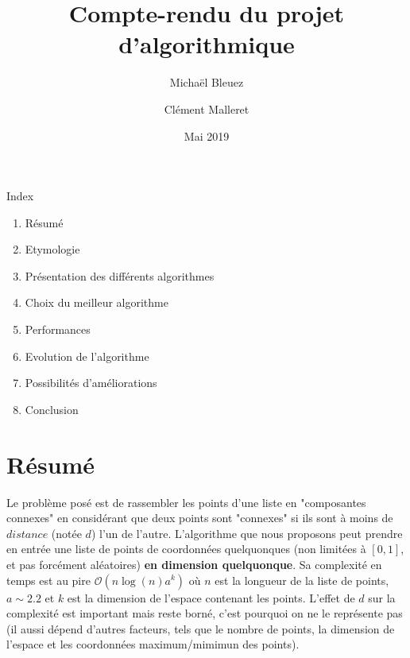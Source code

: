 \documentclass[a4paper,11pt]{article}
\title{Compte-rendu du projet d'algorithmique}
\author{Michaël Bleuez \and Clément Malleret}
\date{Mai 2019}
\begin{document}
\maketitle

Index
\begin{enumerate}
    \item {Résumé}
    \item {Etymologie}
    \item {Présentation des différents algorithmes}
    \item {Choix du meilleur algorithme}
    \item {Performances}
    \item {Evolution de l'algorithme}
    \item {Possibilités d'améliorations}
    \item {Conclusion}
\end{enumerate}

\section{Résumé}
Le problème posé est de rassembler les points d'une liste en "composantes connexes" en considérant que  deux points sont "connexes" si ils sont à moins de $distance$ (notée $d$) l'un de l'autre.
\smallbreak
L'algorithme que nous proposons peut prendre en entrée une liste de points de coordonnées quelquonques (non limitées à $[0,1]$, et pas forcément aléatoires) \textbf{en dimension quelquonque}.
\smallbreak
Sa complexité en temps est au pire $\mathcal{O}(n \log(n) a^k)$ où $n$ est la longueur de la liste de points, $a \sim 2.2$ et $k$ est la dimension de l'espace contenant les points. L'effet de $d$ sur la complexité est important mais reste borné, c'est pourquoi on ne le représente pas (il aussi dépend d'autres facteurs, tels que le nombre de points, la dimension de l'espace et les coordonnées maximum/mimimun des points).
\end{document}

